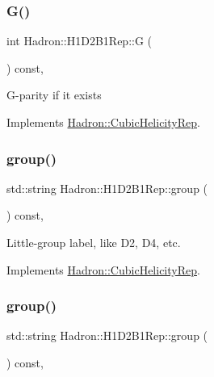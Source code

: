 \subsubsection{\texorpdfstring{G()}{G()}\hspace{0.1cm}{\footnotesize\ttfamily [3/3]}}
{\footnotesize\ttfamily int Hadron\+::\+H1\+D2\+B1\+Rep\+::G (\begin{DoxyParamCaption}{ }\end{DoxyParamCaption}) const\hspace{0.3cm}{\ttfamily [inline]}, {\ttfamily [virtual]}}

G-\/parity if it exists 

Implements \mbox{\hyperlink{structHadron_1_1CubicHelicityRep_a50689f42be1e6170aa8cf6ad0597018b}{Hadron\+::\+Cubic\+Helicity\+Rep}}.

\mbox{\label{structHadron_1_1H1D2B1Rep_a18b7522e1d6bfeeb4abf011f7e6def9a}} 
\subsubsection{\texorpdfstring{group()}{group()}\hspace{0.1cm}{\footnotesize\ttfamily [1/5]}}
{\footnotesize\ttfamily std\+::string Hadron\+::\+H1\+D2\+B1\+Rep\+::group (\begin{DoxyParamCaption}{ }\end{DoxyParamCaption}) const\hspace{0.3cm}{\ttfamily [inline]}, {\ttfamily [virtual]}}

Little-\/group label, like D2, D4, etc. 

Implements \mbox{\hyperlink{structHadron_1_1CubicHelicityRep_a101a7d76cd8ccdad0f272db44b766113}{Hadron\+::\+Cubic\+Helicity\+Rep}}.

\mbox{\label{structHadron_1_1H1D2B1Rep_a18b7522e1d6bfeeb4abf011f7e6def9a}} 
\subsubsection{\texorpdfstring{group()}{group()}\hspace{0.1cm}{\footnotesize\ttfamily [2/5]}}
{\footnotesize\ttfamily std\+::string Hadron\+::\+H1\+D2\+B1\+Rep\+::group (\begin{DoxyParamCaption}{ }\end{DoxyParamCaption}) const\hspace{0.3cm}{\ttfamily [inline]}, {\ttfamily [virtual]}}

